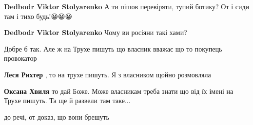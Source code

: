 \begin{itemize}
\begin{itemize}
\textbf{Dedbodr Viktor Stolyarenko} А ти пішов перевіряти, тупий ботику? От і сиди там і тихо будь!😀😀😀

 
\textbf{Dedbodr Viktor Stolyarenko} Чому ви росіяни такі хами?
\end{itemize}

 
Добре б так. Але ж на Трухе пишуть що власник вважає що то покупець провокатор

\begin{itemize}
 
\textbf{Леся Рихтер} , то на трухе пишуть. Я з власником щойно розмовляла

 
\textbf{Оксана Хвиля} то дай Боже. Може власникам треба знати що від їх імені на Трухе пишуть. Та ще й развели там таке...

 
до речі, от доказ, що вони брешуть
\end{itemize}

 

\end{itemize}

